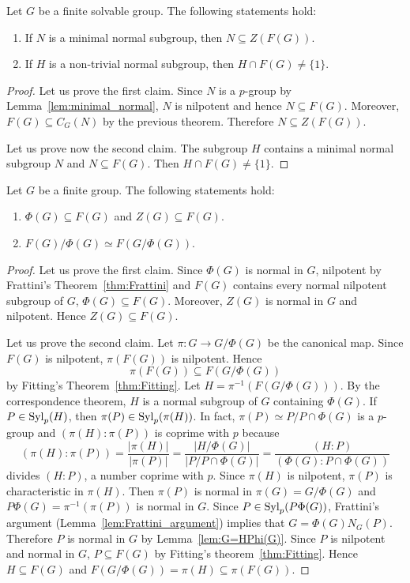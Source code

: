 \begin{corollary}
Let $G$ be a finite solvable group. The following statements hold: 
\begin{enumerate}
\item If $N$ is a minimal normal subgroup, then $N\subseteq Z(F(G))$. 
\item If $H$ is a non-trivial normal subgroup, then $H\cap F(G)\ne\{1\}$.
\end{enumerate}
\end{corollary}

\begin{proof}
Let us prove the first claim. Since $N$ is a $p$-group by Lemma~\ref{lem:minimal_normal}, 
$N$ is nilpotent and hence $N\subseteq F(G)$. Moreover, $F(G)\subseteq C_G(N)$ by the previous theorem. 
Therefore $N\subseteq Z(F(G))$. 

Let us prove now the second claim. The subgroup $H$ contains a minimal normal subgroup $N$ and 
$N\subseteq F(G)$. Then $H\cap F(G)\ne\{1\}$. 
\end{proof}

\begin{theorem}
Let $G$ be a finite group. The following statements hold:
\begin{enumerate}
\item $\Phi(G)\subseteq F(G)$ and $Z(G)\subseteq F(G)$.
\item $F(G)/\Phi(G)\simeq F(G/\Phi(G))$.
\end{enumerate}
\end{theorem}

\begin{proof}
Let us prove the first claim. Since $\Phi(G)$ is normal in $G$, nilpotent by 
Frattini's Theorem~\ref{thm:Frattini} and $F(G)$ contains every normal nilpotent subgroup of $G$, 
$\Phi(G)\subseteq F(G)$. Moreover, $Z(G)$ is normal in $G$ and nilpotent. Hence 
$Z(G)\subseteq F(G)$.

Let us prove the second claim. Let $\pi\colon G\to G/\Phi(G)$ be the canonical map. Since 
$F(G)$ is nilpotent, $\pi(F(G))$ is nilpotent. Hence 
\[
\pi(F(G))\subseteq F(G/\Phi(G))
\]
by Fitting's Theorem~\ref{thm:Fitting}. Let 
$H=\pi^{-1}(F(G/\Phi(G)))$. By the correspondence theorem, $H$ is a normal 
subgroup of $G$ containing $\Phi(G)$. If $P\in\mathrm{Syl}_p(H)$, then 
$\pi(P)\in\mathrm{Syl}_p(\pi(H))$. In fact, $\pi(P)\simeq P/P\cap \Phi(G)$ is a $p$-group and 
$(\pi(H):\pi(P))$ is coprime with $p$ because 
	\[
	(\pi(H):\pi(P))
	=\frac{|\pi(H)|}{|\pi(P)|}
	=\frac{|H/\Phi(G)|}{|P/P\cap \Phi(G)|}
	=\frac{(H:P)}{(\Phi(G):P\cap\Phi(G))}
	\]
divides $(H:P)$, a number coprime with $p$. Since $\pi(H)$ is nilpotent, 
$\pi(P)$ is characteristic in $\pi(H)$. Then $\pi(P)$ is normal
in $\pi(G)=G/\Phi(G)$ and $P\Phi(G)=\pi^{-1}(\pi(P))$ is normal 
in $G$. Since $P\in\mathrm{Syl}_p(P\Phi(G))$, Frattini's argument (Lemma~\ref{lem:Frattini_argument}) implies that 
$G=\Phi(G)N_G(P)$. Therefore $P$
is normal in $G$ by Lemma~\ref{lem:G=HPhi(G)}. Since $P$ is nilpotent and normal in $G$, 
$P\subseteq F(G)$ by Fitting's theorem~\ref{thm:Fitting}. Hence 
$H\subseteq F(G)$ and 
$F(G/\Phi(G))=\pi(H)\subseteq \pi(F(G))$.
\end{proof}

